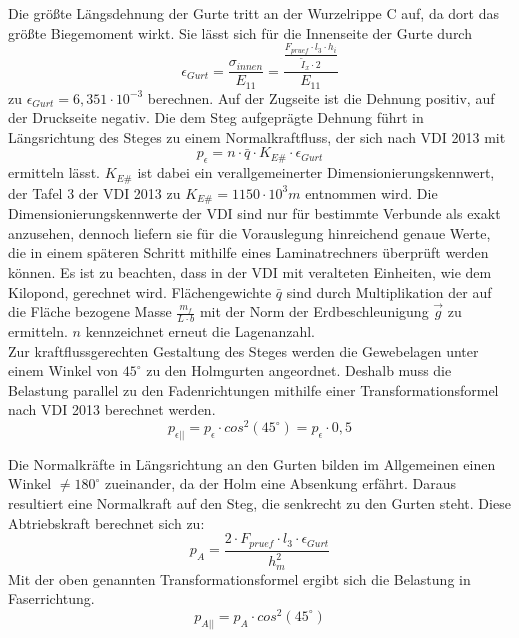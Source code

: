 \noindent Die größte Längsdehnung der Gurte tritt an der Wurzelrippe C auf, da dort das größte Biegemoment wirkt. Sie lässt sich für die Innenseite der Gurte durch
\begin{equation}
	\epsilon_{Gurt}=\frac{\sigma_{innen}}{E_{11}}=\frac{\frac{F_{pruef}\cdot l_{3}\cdot h_{i}}{\tilde{I}_{x}\cdot 2}}{E_{11}}
\end{equation}  
 zu $ \epsilon_{Gurt}=6,351\cdot 10^{-3} $ berechnen. Auf der Zugseite ist die Dehnung positiv, auf der Druckseite negativ. Die dem Steg aufgeprägte Dehnung führt in Längsrichtung des Steges zu einem Normalkraftfluss, der sich nach VDI 2013 mit
 \begin{equation}
 	p_{\epsilon}=n\cdot \bar{q}\cdot K_{E\#}\cdot \epsilon_{Gurt}
 \end{equation} 
ermitteln lässt. $ K_{E\#} $ ist dabei ein verallgemeinerter Dimensionierungskennwert, der Tafel 3 der VDI 2013 zu $ K_{E\#}=1150\cdot 10^{3}m $ entnommen wird. Die Dimensionierungskennwerte der VDI sind nur für bestimmte Verbunde als exakt anzusehen, dennoch liefern sie für die Vorauslegung hinreichend genaue Werte, die in einem späteren Schritt mithilfe eines Laminatrechners überprüft werden können. Es ist zu beachten, dass in der VDI mit veralteten Einheiten, wie dem Kilopond, gerechnet wird. Flächengewichte $ \bar{q} $ sind durch Multiplikation der auf die Fläche bezogene Masse $ \frac{m_{f}}{L\cdot b} $ mit der Norm der Erdbeschleunigung $ \vec{g} $ zu ermitteln. $ n $ kennzeichnet erneut die Lagenanzahl.\\

\noindent Zur kraftflussgerechten Gestaltung des Steges werden die Gewebelagen unter einem Winkel von $ 45^{\circ} $ zu den Holmgurten angeordnet. Deshalb muss die Belastung parallel zu den Fadenrichtungen mithilfe einer Transformationsformel nach VDI 2013 berechnet werden.
\begin{equation}
	p_{\epsilon||}=p_{\epsilon}\cdot cos^{2}\left(45^{\circ} \right)=p_{\epsilon}\cdot 0,5 
\end{equation}

\noindent Die Normalkräfte in Längsrichtung an den Gurten bilden im Allgemeinen einen Winkel $ \neq180^{\circ} $ zueinander, da der Holm eine Absenkung erfährt. Daraus resultiert eine Normalkraft auf den Steg, die senkrecht zu den Gurten steht. Diese Abtriebskraft berechnet sich zu:
\begin{equation}
	p_{A}=\frac{2\cdot F_{pruef}\cdot l_{3}\cdot\epsilon_{Gurt}}{h_{m}^{2}}
\end{equation}
 Mit der oben genannten Transformationsformel ergibt sich die Belastung in Faserrichtung.
 \begin{equation}
 	p_{A||}=p_{A}\cdot cos^{2}\left(45^{\circ} \right)
 \end{equation} 

